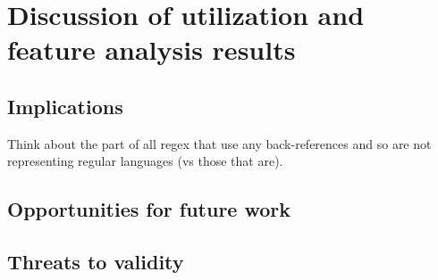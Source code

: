 \section{Discussion of utilization and feature analysis results}

\subsection{Implications}
Think about the part of all regex that use any back-references and so are not representing regular languages (vs those that are).
\subsection{Opportunities for future work}
\subsection{Threats to validity}
